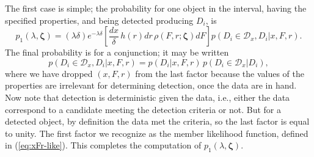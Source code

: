 \documentclass[12pt]{article}
\numberwithin{equation}{section}
\numberwithin{figure}{section}
\numberwithin{table}{section}
\newcommand{\rhopar}{\boldsymbol{\zeta}}
\newcommand{\dtxns}{\mathcal{D}}
\begin{document}
The first case is simple; the probability for one object in the interval, having the specified properties, and being detected producing $D_i$, is
\begin{equation}\label{eq:dtxn1}
p_1(\lambda,\rhopar) = 
  (\lambda \delta) e^{-\lambda \delta} 
  \left[\frac{dx}{\delta}\, h(r)dr\, \rho(F,r;\rhopar)dF\right]
  p(D_i\in\dtxns_x, D_i|x,F,r).
\end{equation}
The final probability is for a conjunction; it may be written
\begin{equation}\label{eq:dtxn-joint}
p(D_i\in\dtxns_x, D_i|x,F,r) = p(D_i|x,F,r)\, p(D_i\in\dtxns_x | D_i),
\end{equation}
where we have dropped $(x,F,r)$ from the last factor because the values of the properties are irrelevant for determining detection, once the data are in hand.
Now note that detection is deterministic given the data, i.e., either the data correspond to a candidate meeting the detection criteria or not.
But for a detected object, by definition the data met the criteria, so the last factor is equal to unity.
The first factor we recognize as the member likelihood function, defined in (\ref{eq:xFr-like}).
This completes the computation of $p_1(\lambda,\rhopar)$.
\end{document}
